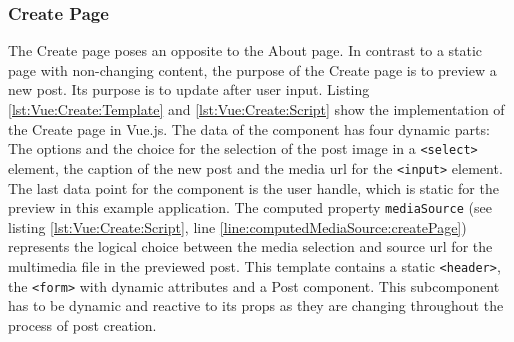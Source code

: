 \documentclass[a4paper, 12pt]{article}
\begin{document}
\subsubsection{Create Page}

The Create page poses an opposite to the About page.
In contrast to a static page with non-changing content, the purpose of the Create page is to preview a new post.
Its purpose is to update after user input.
Listing \ref{lst:Vue:Create:Template} and \ref{lst:Vue:Create:Script} show the implementation of the Create page in Vue.js.
The data of the component has four dynamic parts: The options and the choice for the selection of the post image in a \verb|<select>| element, the caption of the new post and the media \acrshort{url} for the \verb|<input>| element.
The last data point for the component is the user handle, which is static for the preview in this example application.
The computed property \verb|mediaSource| (see listing \ref{lst:Vue:Create:Script}, line \ref{line:computedMediaSource:createPage}) represents the logical choice between the media selection and source \acrshort{url} for the multimedia file in the previewed post.
This template contains a static \verb|<header>|, the \verb|<form>| with dynamic attributes and a Post component.
This subcomponent has to be dynamic and reactive to its props as they are changing throughout the process of post creation.
\end{document}
